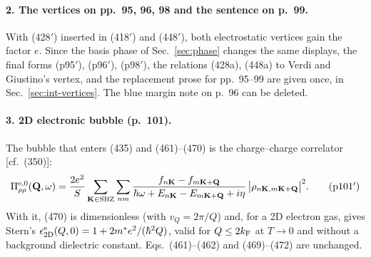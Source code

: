 \documentclass[11pt]{article}
\begin{document}
\paragraph{2. The vertices on pp.~95, 96, 98 and the sentence on p.~99.}
With (428$'$) inserted in (418$'$) and (448$'$), both electrostatic vertices gain the factor $e$. Since
the basis phase of Sec.~\ref{sec:phase} changes the same displays, the final forms (p95$'$), (p96$'$),
(p98$'$), the relations (428a), (448a) to Verdi and Giustino's vertex, and the replacement prose for
pp.~95--99 are given once, in Sec.~\ref{sec:int-vertices}. The blue margin note on p.~96 can be deleted.

\paragraph{3. 2D electronic bubble (p.~101).}
The bubble that enters (435) and (461)--(470) is the charge--charge correlator [cf.\ (350)]:
\begin{equation*}
\Pi^{\rm e,0}_{\rho\rho}(\mathbf Q,\omega)=\frac{2e^2}{S}\sum_{\mathbf K\in{\rm SBZ}}\sum_{nm}
\frac{f_{n\mathbf K}-f_{m\mathbf K+\mathbf Q}}{\hbar\omega+E_{n\mathbf K}-E_{m\mathbf K+\mathbf Q}+i\eta}\,
\big|\rho_{n\mathbf K,m\mathbf K+\mathbf Q}\big|^2 .
\tag{p101$'$}
\end{equation*}
With it, (470) is dimensionless (with $v_Q=2\pi/Q$) and, for a 2D electron gas, gives Stern's
$\epsilon^{\rm e}_{\rm 2D}(Q,0)=1+2m^*e^2/(\hbar^2Q)$, valid for $Q\le2k_{\rm F}$ at $T\to0$ and without a
background dielectric constant. Eqs.~(461)--(462) and (469)--(472) are unchanged.
\end{document}
